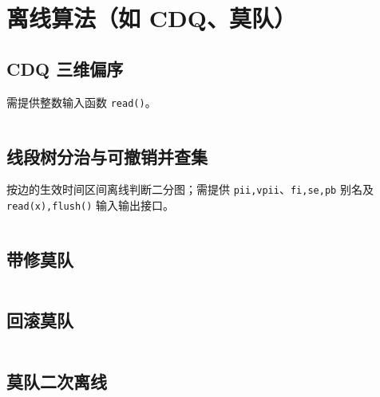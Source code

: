 \section{离线算法（如 CDQ、莫队）}
				\subsection{CDQ 三维偏序}
					需提供整数输入函数 \texttt{read()}。
					\inputminted{cpp}{sections/OfflineAlgorithms/assets/DataStructure/三维偏序.cpp}
				\subsection{线段树分治与可撤销并查集}
					按边的生效时间区间离线判断二分图；需提供 \texttt{pii,vpii}、\texttt{fi,se,pb} 别名及 \texttt{read(x),flush()} 输入输出接口。
					\inputminted{cpp}{sections/OfflineAlgorithms/assets/DataStructure/线段树分治.cpp}
				\subsection{带修莫队}
					\inputminted{cpp}{sections/OfflineAlgorithms/assets/DataStructure/带修莫队.cpp}
				\subsection{回滚莫队}
					\inputminted{cpp}{sections/OfflineAlgorithms/assets/DataStructure/回滚莫队.cpp}
				\subsection{莫队二次离线}
					\inputminted{cpp}{sections/OfflineAlgorithms/assets/DataStructure/莫队二次离线.cpp}
